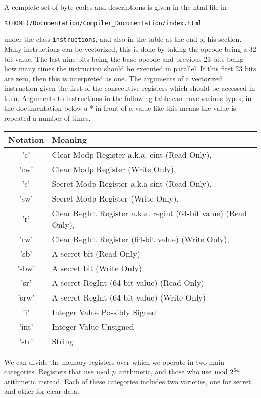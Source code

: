 A complete set of byte-codes and descriptions is
given in the html file in
\begin{center}
   \verb+$(HOME)/Documentation/Compiler_Documentation/index.html+
\end{center}
under the class \verb+instructions+, and also in the table at the
end of his section.
Many instructions can be vectorized, this is done by taking the opcode
being a 32 bit value. The last nine bits being the base opcode and previous
23 bits being how many times the instruction should be executed in
parallel. If this first 23 bits are zero, then this is interpreted as
one. The arguments of a vectorized instruction given the first
of the consecutive registers which should be accessed in turn.
Arguments to instructions in the following table can have various types,
in the documentation below a * in front of a value like this means
the value is repeated a number of times.
\begin{center}
\begin{tabular}{|c|l|}
\hline
Notation  & Meaning \\
\hline
    'c'   & Clear Modp Register a.k.a. cint (Read Only), \\
    'cw'  & Clear Modp Register (Write Only), \\
    's'   & Secret Modp Register a.k.a sint (Read Only), \\
    'sw'  & Secret Modp Register (Write Only), \\
    'r'   & Clear RegInt Register a.k.a. regint (64-bit value) (Read Only), \\
    'rw'  & Clear RegInt Register (64-bit value) (Write Only), \\
    'sb'  & A secret bit (Read Only) \\
    'sbw' & A secret bit (Write Only) \\
    'sr'  & A secret RegInt (64-bit value) (Read Only) \\
    'srw' & A secret RegInt (64-bit value) (Write Only) \\
    'i'   & Integer Value Possibly Signed \\
    'int' & Integer Value Unsigned \\
    'str' & String \\
\hline
\end{tabular}
\end{center}
We can divide the memory registers over which we operate in two main categories.
Registers that use $\bmod \; p$ arithmetic, and those who use $\bmod \; 2^{64}$ arithmetic instead.
Each of these categories includes two varieties, one for secret and other for clear data.
